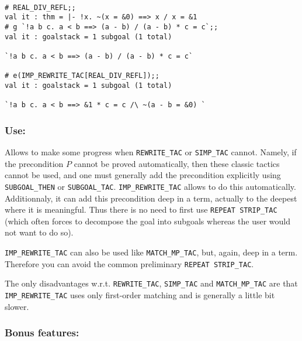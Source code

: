 \documentclass{llncs}
\newcommand*\IMPREWRITETAC{\texttt{IMP\_REWRITE\_TAC}\xspace}
\newcommand*\REWRITETAC{\texttt{REWRITE\_TAC}\xspace}
\newcommand*\SIMPTAC{\texttt{SIMP\_TAC}\xspace}
\newcommand*\MATCHMPTAC{\texttt{MATCH\_MP\_TAC}\xspace}
\begin{document}
    \begin{example}
      \label{ex:imp_rewrite_tac}
    \begin{verbatim}

# REAL_DIV_REFL;;
val it : thm = |- !x. ~(x = &0) ==> x / x = &1
# g `!a b c. a < b ==> (a - b) / (a - b) * c = c`;;
val it : goalstack = 1 subgoal (1 total)

`!a b c. a < b ==> (a - b) / (a - b) * c = c`

# e(IMP_REWRITE_TAC[REAL_DIV_REFL]);;
val it : goalstack = 1 subgoal (1 total)

`!a b c. a < b ==> &1 * c = c /\ ~(a - b = &0) ` \end{verbatim}
    \end{example}
    

    \subsubsection{Use:}
    Allows to make some progress when \REWRITETAC or \SIMPTAC cannot.
    Namely, if the precondition $P$ cannot be proved automatically, then these classic tactics cannot be used,
    and one must generally add the precondition explicitly using \texttt{SUBGOAL\_THEN} or \texttt{SUBGOAL\_TAC}.
    \IMPREWRITETAC allows to do this automatically.
    Additionnaly, it can add this precondition deep in a term, actually to the deepest where it is meaningful.
    Thus there is no need to first use \texttt{REPEAT STRIP\_TAC} (which often forces to decompose the goal
    into subgoals whereas the user would not want to do so).

    \IMPREWRITETAC can also be used like \MATCHMPTAC, but, again, deep in a term.
    Therefore you can avoid the common preliminary \texttt{REPEAT STRIP\_TAC}.

    The only disadvantages w.r.t. \REWRITETAC, \SIMPTAC and \MATCHMPTAC
    are that \IMPREWRITETAC uses only first-order matching and is generally a little bit slower.

		\subsubsection{Bonus features:}
\end{document}
